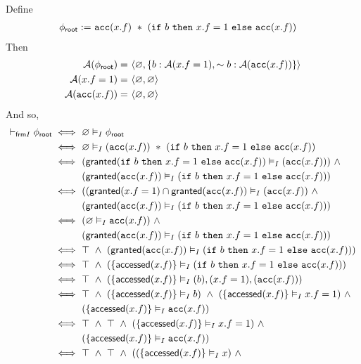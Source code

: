 Define
\begin{align*}
{\phi_\textsf{root}} := & \
\texttt{acc}(x.f) \ \ast \
(\texttt{if} \ b \ \texttt{then} \ x.f = 1 \ \texttt{else} \ \texttt{acc}(x.f))
\end{align*}
Then
\begin{align*}
\mathcal{A}({\phi_\textsf{root}}) = & \
\langle \varnothing, \left\{  b: \mathcal{A}(x.f = 1), \sim b: \mathcal{A}(\texttt{acc}(x.f))  \right\} \rangle \\
\mathcal{A}(x.f = 1) = & \ \langle \varnothing, \varnothing \rangle \\
\mathcal{A}(\texttt{acc}(x.f)) = & \ \langle \varnothing, \varnothing \rangle
\end{align*}
And so,
\begin{align*}
\selfframing \phiroot \iff & \
\empty \frames \phiroot
\\ \iff & \
\empty \frames (\cacc(x.f)) \ \ast \ (\cif \ b \ \cthen \ x.f = 1 \ \celse \ \cacc(x.f))
\\ \iff & \
( \granted(\cif \ b \ \cthen \ x.f = 1 \ \celse \ \cacc(x.f)) \frames (\cacc(x.f)) ) \ \land \\ & \
( \granted(\cacc(x.f)) \frames (\cif \ b \ \cthen \ x.f = 1 \ \celse \ \cacc(x.f)) )
\\ \iff & \
( ( \granted(x.f=1) \cap \granted(\cacc(x.f) ) \frames ( \cacc(x.f) ) \ \land \\ & \
( \granted(\cacc(x.f)) \frames (\cif \ b \ \cthen \ x.f = 1 \ \celse \ \cacc(x.f)) )
\\ \iff & \
( \empty \frames \cacc(x.f) ) \ \land \\ & \
( \granted(\cacc(x.f)) \frames (\cif \ b \ \cthen \ x.f = 1 \ \celse \ \cacc(x.f)) )
\\ \iff & \
\top \ \land \
( \granted(\cacc(x.f)) \frames (\cif \ b \ \cthen \ x.f = 1 \ \celse \ \cacc(x.f)) )
\\ \iff & \
\top \ \land \
( \set{ \accessed(x.f) } \frames (\cif \ b \ \cthen \ x.f = 1 \ \celse \ \cacc(x.f)) )
\\ \iff & \
\top \ \land \
( \set{ \accessed(x.f) } \frames (b), (x.f=1), (\cacc(x.f)) )
\\ \iff & \
\top \ \land \
(\set{ \accessed(x.f) } \frames b) \ \land \
(\set{ \accessed(x.f) } \frames x.f=1) \ \land \\ & \
(\set{ \accessed(x.f) } \frames \cacc(x.f))
\\ \iff & \
\top \ \land \
\top \ \land \
(\set{ \accessed(x.f) } \frames x.f=1) \ \land \\ & \
(\set{ \accessed(x.f) } \frames \cacc(x.f))
\\ \iff & \
\top \ \land \ \top \ \land \
((\set{ \accessed(x.f) } \frames x) \ \land \

\end{align*}
